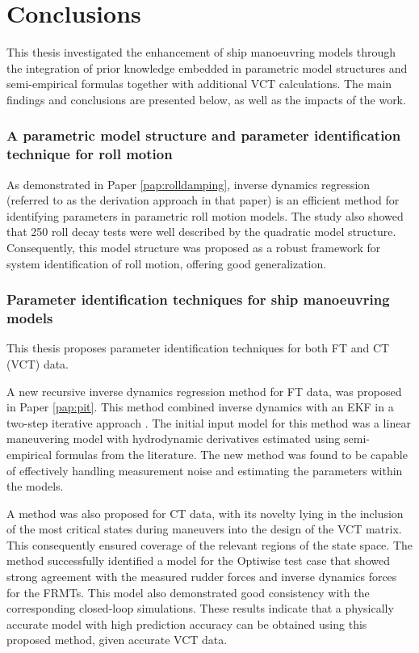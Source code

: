 \chapter{Conclusions\label{ch:conclusions}}

\noindent This thesis investigated the enhancement of ship manoeuvring models through the
integration of prior knowledge embedded in parametric model structures and semi-empirical
formulas together with additional VCT calculations. 
The main findings and conclusions are presented below, as well as the impacts of the work.

\subsection*{A parametric model structure and parameter identification technique for roll motion}
As demonstrated in Paper \ref{pap:rolldamping}, inverse dynamics regression (referred to as the derivation approach in that paper) is an efficient method for identifying parameters in parametric roll motion models. The study also showed that 250 roll decay tests were well described by the quadratic model structure. Consequently, this model structure was proposed as a robust framework for system identification of roll motion, offering good generalization.

\subsection*{Parameter identification techniques for ship manoeuvring models}
This thesis proposes parameter identification techniques for both FT and CT (VCT) data.

A new recursive inverse dynamics regression method for FT data, was proposed in Paper \ref{pap:pit}. This method combined inverse dynamics with an EKF in a two-step iterative approach \cite{yoonIdentificationHydrodynamicCoefficients2003}. The initial input model for this method was a linear maneuvering model with hydrodynamic derivatives estimated using semi-empirical formulas from the literature. The new method was found to be capable of effectively handling measurement noise and estimating the parameters within the models. 

A method was also proposed for CT data, with its novelty lying in the inclusion of the most critical states during maneuvers into the design of the VCT matrix. This consequently ensured coverage of the relevant regions of the state space. The method successfully identified a model for the Optiwise test case that showed strong agreement with the measured rudder forces and inverse dynamics forces for the FRMTs. This model also demonstrated good consistency with the corresponding closed-loop simulations. These results indicate that a physically accurate model with high prediction accuracy can be obtained using this proposed method, given accurate VCT data.  

